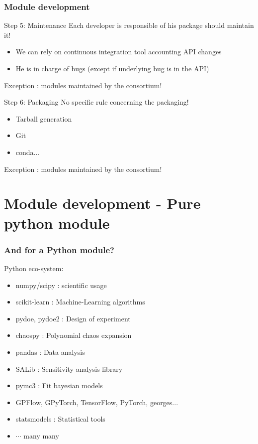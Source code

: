 \documentclass[8pt]{beamer}
\begin{document}
\begin{frame}
  \frametitle{Module development}
  \begin{block}{Step 5: Maintenance}
    Each developer is responsible of his package should maintain it!
    \begin{itemize}
    \item We can rely on continuous integration tool accounting API changes
    \item He is in charge of bugs (except if underlying bug is in the API)
    \end{itemize}
    Exception : modules maintained by the consortium!
  \end{block}
  
  \begin{block}{Step 6: Packaging}
    No specific rule concerning the packaging!
    \begin{itemize}
    \item Tarball generation
    \item Git
    \item conda...
    \end{itemize}
    Exception : modules maintained by the consortium!
  \end{block}
\end{frame}


\section[Module development]{Module development - Pure python module}
  \begin{frame}[containsverbatim]
    \frametitle{And for a Python module?}
        
    Python eco-system:
    \begin{itemize}
    \item \alert{numpy/scipy} : scientific usage 
    \item \alert{scikit-learn} : Machine-Learning algorithms
    \item \alert{pydoe, pydoe2} : Design of experiment
    \item \alert{chaospy} : Polynomial chaos expansion
    \item \alert{pandas} : Data analysis
    \item \alert{SALib} : Sensitivity analysis library
    \item \alert{pymc3} : Fit bayesian models
    \item \alert{GPFlow, GPyTorch, TensorFlow, PyTorch, georges...  }
    \item \alert{statsmodels} : Statistical tools
    \item $\cdots$ many many 
    \end{itemize}
    \end{frame}
\end{document}

